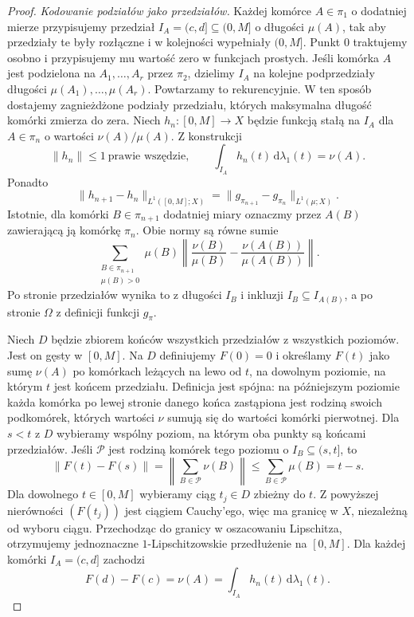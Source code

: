 \begin{proof}
\emph{Kodowanie podziałów jako przedziałów.}
Każdej komórce $A\in\pi_1$ o dodatniej mierze
przypisujemy przedział $I_A=(c,d]\subseteq(0,M]$
o długości $\mu(A)$, tak aby przedziały te
były rozłączne i w kolejności wypełniały $(0,M]$.
Punkt $0$ traktujemy osobno i przypisujemy mu
wartość zero w funkcjach prostych.
Jeśli komórka $A$ jest podzielona na
$A_1,\ldots,A_r$ przez $\pi_2$, dzielimy
$I_A$ na kolejne podprzedziały długości
$\mu(A_1),\ldots,\mu(A_r)$. Powtarzamy to
rekurencyjnie. W ten sposób dostajemy zagnieżdżone
podziały przedziału, których maksymalna długość
komórki zmierza do zera. Niech $h_n:[0,M]\to X$
będzie funkcją stałą na $I_A$ dla $A\in\pi_n$
o wartości $\nu(A)/\mu(A)$. Z konstrukcji
\[
 \|h_n\|\le1\ \text{prawie wszędzie},\qquad
 \int_{I_A}h_n(t)\,\mathrm d\lambda_1(t)=\nu(A).
\]
Ponadto
\[
 \|h_{n+1}-h_n\|_{L^1([0,M];X)}
 =\|g_{\pi_{n+1}}-g_{\pi_n}\|_{L^1(\mu;X)}.
\]
Istotnie, dla komórki $B\in\pi_{n+1}$ dodatniej
miary oznaczmy przez $A(B)$ zawierającą ją
komórkę $\pi_n$. Obie normy są równe sumie
\[
 \sum_{\substack{B\in\pi_{n+1}\\\mu(B)>0}}
 \mu(B)\left\|\frac{\nu(B)}{\mu(B)}
 -\frac{\nu(A(B))}{\mu(A(B))}\right\|.
\]
Po stronie przedziałów wynika to z długości $I_B$
i inkluzji $I_B\subseteq I_{A(B)}$, a po stronie
$\Omega$ z definicji funkcji $g_\pi$.

Niech $D$ będzie zbiorem końców wszystkich
przedziałów z wszystkich poziomów. Jest on
gęsty w $[0,M]$. Na $D$ definiujemy $F(0)=0$
i określamy $F(t)$ jako sumę $\nu(A)$ po
komórkach leżących na lewo od $t$, na dowolnym
poziomie, na którym $t$ jest końcem przedziału.
Definicja jest spójna: na późniejszym poziomie
każda komórka po lewej stronie danego końca
zastąpiona jest rodziną swoich podkomórek, których
wartości $\nu$ sumują się do wartości komórki
pierwotnej. Dla $s<t$ z $D$ wybieramy wspólny
poziom, na którym oba punkty są końcami przedziałów.
Jeśli $\mathcal P$ jest rodziną komórek tego poziomu
o $I_B\subseteq(s,t]$, to
\[
 \|F(t)-F(s)\|=\left\|\sum_{B\in\mathcal P}\nu(B)\right\|
 \le\sum_{B\in\mathcal P}\mu(B)=t-s.
\]
Dla dowolnego $t\in[0,M]$ wybieramy ciąg $t_j\in D$
zbieżny do $t$. Z powyższej nierówności $(F(t_j))$
jest ciągiem Cauchy'ego, więc ma granicę w $X$,
niezależną od wyboru ciągu. Przechodząc do granicy
w oszacowaniu Lipschitza, otrzymujemy jednoznaczne
$1$-Lipschitzowskie przedłużenie na $[0,M]$.
Dla każdej komórki $I_A=(c,d]$ zachodzi
\begin{equation}\label{eq:rnp-interval-average-30}
 F(d)-F(c)=\nu(A)
 =\int_{I_A}h_n(t)\,\mathrm d\lambda_1(t).
\end{equation}


\end{proof}
